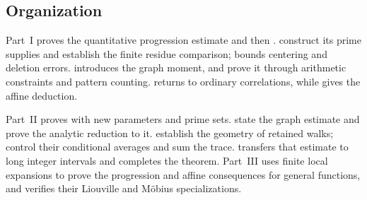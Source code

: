 \subsection{Organization}

Part~I proves the quantitative progression estimate and then
.
 construct its prime supplies and
establish the finite residue comparison;  bounds
centering and deletion errors.  introduces the
graph moment, and  prove
it through arithmetic constraints and pattern counting.
 returns to ordinary correlations, while
 gives the affine deduction.

Part~II proves  with new parameters and prime sets.
state the graph estimate and prove the analytic reduction to it.
 establish the geometry of retained walks;
 control their conditional
averages and sum the trace.  transfers that
estimate to long integer intervals and completes the theorem.
Part~III uses finite local expansions to prove the progression and
affine consequences for general functions, and verifies their
Liouville and M\"obius specializations.
